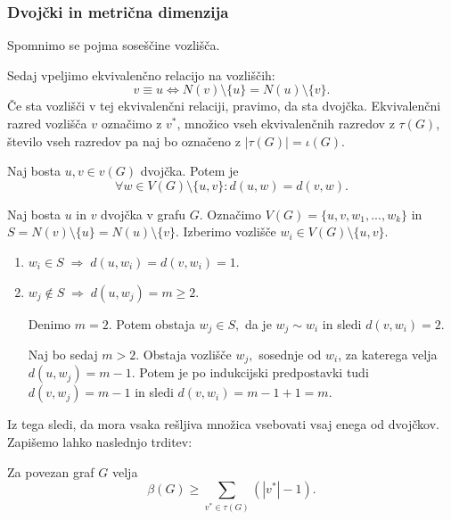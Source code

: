 \documentclass[mat1, tisk]{fmfdelo}
\newcommand{\1}{(1, 1, ..., 1)}
\newcommand{\2}{(2, 2, ..., 2)}
\begin{document}


\subsubsection{Dvojčki in metrična dimenzija} \label{ss:dvojcki_mdim}
Spomnimo se pojma soseščine vozlišča.



Sedaj vpeljimo ekvivalenčno relacijo na vozliščih:
\begin{equation}\label{eq:dvojcki}
v \equiv u \Leftrightarrow N(v)\setminus \{u\} = N(u) \setminus \{v\}.
\end{equation}
Če sta vozlišči v tej ekvivalenčni relaciji, pravimo, da sta dvojčka. 
Ekvivalenčni razred vozlišča $v$ označimo z $v^{*}$, 
množico vseh ekvivalenčnih razredov z $\tau (G)$, število vseh razredov pa naj bo označeno 
z $|\tau(G)| = \iota(G).$


\begin{lema} \label{lema:dvojcki_razdalje}
    Naj bosta $u, v \in v(G)$ dvojčka. Potem je 
    $$\forall w \in V(G) \setminus \{u, v\} : d(u, w) = d(v, w).$$
\end{lema}

\begin{dokaz}
    Naj bosta $u$ in $v$ dvojčka v grafu $G$. Označimo $V(G) = \{u, v, w_1, ..., w_k\}$ 
    in $S = N(v)\setminus \{u\} = N(u) \setminus \{v\}$. Izberimo vozlišče 
    $w_i \in V(G) \setminus \{u, v\}.$
    \begin{enumerate}
        \item $w_i \in S \; \Rightarrow \; d(u, w_i) = d(v, w_i) = 1.$
        \item $w_j \notin S \; \Rightarrow \; d(u, w_j) = m \geq 2$. 
    
        Denimo $m=2.$ Potem obstaja $w_j \in S,$ da je $w_j \sim w_i$ in sledi $d(v, w_i) = 2.$
        
        Naj bo sedaj $m > 2.$ Obstaja vozlišče $w_j,$ sosednje od $w_i$, za katerega velja 
        $d(u, w_j) = m-1.$ Potem je po indukcijski predpostavki tudi $d(v, w_j) = m-1$ in 
        sledi $d(v, w_i) = m-1 + 1 = m.$
    \end{enumerate}
\end{dokaz}

Iz tega sledi, da mora vsaka rešljiva množica vsebovati vsaj enega od dvojčkov.
Zapišemo lahko naslednjo trditev:

\begin{trditev} \label{trd:meja_mdim_dvojcki}
    Za povezan graf $G$ velja
    $$\beta(G) \geq \sum_{v^{*} \in \tau(G)} (|v^{*}| - 1).$$
\end{trditev}
\end{document}
